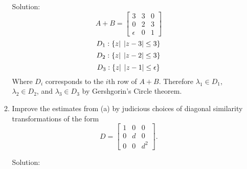 \documentclass[12pt]{article}
\numberwithin{equation}{section}
\begin{document}
\begin{enumerate}
\begin{enumerate}
    Solution:\\

    $$A+B=\left[\begin{array}{ccc}3&3&0\\0&2&3\\ \epsilon&0&1\end{array}\right]$$
    $$D_1:\{z|\hspace{1 ex} |z-3|\leq 3\}$$
    $$D_2:\{z|\hspace{1 ex} |z-2|\leq 3\}$$
    $$D_3:\{z|\hspace{1 ex} |z-1|\leq \epsilon\}$$
    Where $D_i$ corresponds to the $i$th row of $A+B$. Therefore $\lambda_1\in D_1$, $\lambda_2\in D_2$, and $\lambda_3\in D_3$ by Gershgorin's Circle theorem.

    \item Improve the estimates from (a) by judicious choices of diagonal similarity transformations of the form
        $$D=\left[\begin{array}{ccc}1&0&0\\0&d&0\\0&0&d^2\end{array}\right].$$

    Solution:\\


\end{enumerate}
\end{enumerate}
\end{document}
